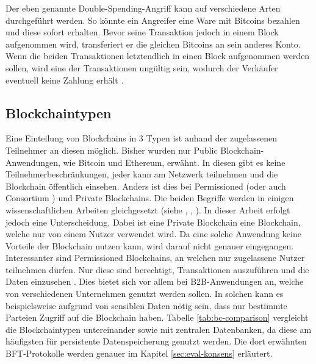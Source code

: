Der eben genannte Double-Spending-Angriff kann auf verschiedene Arten durchgeführt werden. So könnte ein Angreifer eine Ware mit Bitcoins bezahlen und diese sofort erhalten. Bevor seine Transaktion jedoch in einem Block aufgenommen wird, transferiert er die gleichen Bitcoins an sein anderes Konto. Wenn die beiden Transaktionen letztendlich in einen Block aufgenommen werden sollen, wird eine der Transaktionen ungültig sein, wodurch der Verkäufer eventuell keine Zahlung erhält \cite[S.~211 ff.]{AntonopoulosMasteringbitcoin2015}.

\subsection{Blockchaintypen}
Eine Einteilung von Blockchains in 3 Typen ist anhand der zugelassenen Teilnehmer an diesen möglich. Bisher wurden nur Public Blockchain-Anwendungen, wie Bitcoin und Ethereum, erwähnt. In diesen gibt es keine Teilnehmerbeschränkungen, jeder kann am Netzwerk teilnehmen und die Blockchain öffentlich einsehen. Anders ist dies bei Permissioned (oder auch Consortium \cite{BenHamidaBlockchainEnterpriseOverview2017}) und Private Blockchains. Die beiden Begriffe werden in einigen wissenschaftlichen Arbeiten gleichgesetzt (siehe \cite{Gramolidangerprivateblockchains2016}, \cite{PongnumkulPerformanceAnalysisPrivate2017}, \cite{LiScalablePrivateIndustrial2017}). In dieser Arbeit erfolgt jedoch eine Unterscheidung. Dabei ist eine Private Blockchain eine Blockchain, welche nur von einem Nutzer verwendet wird. Da eine solche Anwendung keine Vorteile der Blockchain nutzen kann, wird darauf nicht genauer eingegangen. Interessanter sind Permissioned Blockchains, an welchen nur zugelassene Nutzer teilnehmen dürfen. Nur diese sind berechtigt, Transaktionen auszuführen und die Daten einzusehen \cite{LiScalablePrivateIndustrial2017}. Dies bietet sich vor allem bei \acs{B2B}-Anwendungen an, welche von verschiedenen Unternehmen genutzt werden sollen. In solchen kann es beispielsweise aufgrund von sensiblen Daten nötig sein, dass nur bestimmte Parteien Zugriff auf die Blockchain haben. Tabelle \ref{tab:bc-comparison} vergleicht die Blockchaintypen untereinander sowie mit zentralen Datenbanken, da diese am häufigsten für persistente Datenspeicherung genutzt werden. Die dort erwähnten \acs{BFT}-Protokolle werden genauer im Kapitel \ref{sec:eval-konsens} erläutert.

